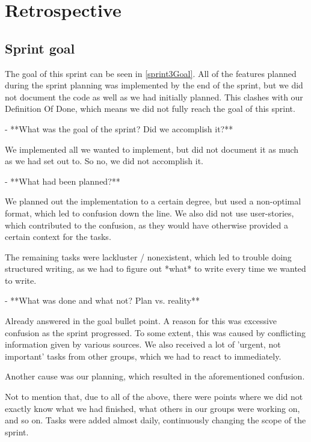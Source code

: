 \section{Retrospective}


\subsection{Sprint goal}
The goal of this sprint can be seen in \ref{sprint3Goal}.
All of the features planned during the sprint planning was implemented by the end of the sprint, but we did not document the code as well as we had initially planned. This clashes with our Definition Of Done, which means we did not fully reach the goal of this sprint.


- **What was the goal of the sprint? Did we accomplish it?**
    
    We implemented all we wanted to implement, but did not document it as much as we had set out to. So no, we did not accomplish it.


    
- **What had been planned?**
    
    We planned out the implementation to a certain degree, but used a non-optimal format, which led to confusion down the line. We also did not use user-stories, which contributed to the confusion, as they would have otherwise provided a certain context for the tasks.
    
    The remaining tasks were lackluster / nonexistent, which led to trouble doing structured writing, as we had to figure out *what* to write every time we wanted to write.
    
- **What was done and what not? Plan vs. reality**
    
    Already answered in the goal bullet point. A reason for this was excessive confusion as the sprint progressed. To some extent, this was caused by conflicting information given by various sources. We also received a lot of 'urgent, not important' tasks from other groups, which we had to react to immediately.
    
    Another cause was our planning, which resulted in the aforementioned confusion.
    
    Not to mention that, due to all of the above, there were points where we did not exactly know what we had finished, what others in our groups were working on, and so on. Tasks were added almost daily, continuously changing the scope of the sprint.
    
